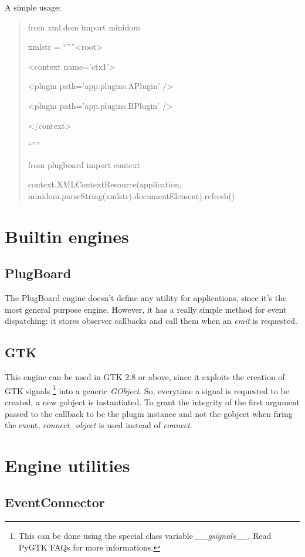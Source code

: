 \documentclass[12pt,a4paper]{report}
\begin{document}
A simple usage:

\begin{quote}
from xml.dom import minidom

xmlstr = {}``''''<root>

<context name='ctx1'>

<plugin path='app.plugins.APlugin' />

<plugin path='app.plugins.BPlugin' />

</context>

{}``''''

from plugboard import context

context.XMLContextResource(application, minidom.parseString(xmlstr).documentElement).refresh()
\end{quote}

\chapter{Builtin engines}


\section*{PlugBoard}

The PlugBoard engine doesn't define any utility for applications,
since it's the most general purpose engine. However, it has a really
simple method for event dispatching: it stores observer callbacks
and call them when an \emph{emit} is requested.


\section*{GTK}

This engine can be used in GTK 2.8 or above, since it exploits the
creation of GTK signals%
\footnote{This can be done using the special class variable \emph{\_\_gsignals\_\_}.
Read PyGTK FAQs for more informations.%
} into a generic \emph{GObject}. So, everytime a signal is requested
to be created, a new gobject is instantiated. To grant the integrity
of the first argument passed to the callback to be the plugin instance
and not the gobject when firing the event, \emph{connect\_object}
is used instead of \emph{connect}.


\chapter{Engine utilities}


\section{EventConnector}
\end{document}
